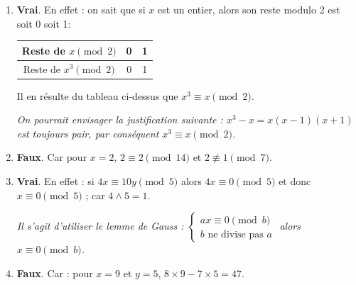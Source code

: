 \documentclass[11pt]{article}
\newcommand{\checkmarkline}[1]{\par\hspace{1.5em}\checkmark\quad \textit{#1}}
\begin{document}
\begin{enumerate}
    \item \textbf{Vrai}. En effet : on sait que si $x$ est un entier, alors son reste modulo 2 est soit 0 soit 1:
    \begin{center}
    \begin{tabular}{|c|c|c|}
        \hline
        Reste de $x \pmod 2$ & 0 & 1 \\
        \hline
        Reste de $x^3 \pmod 2$ & 0 & 1 \\
        \hline
    \end{tabular}
    \end{center}
    Il en résulte du tableau ci-dessus que $x^3 \equiv x \pmod 2$.
    \checkmarkline{On pourrait envisager la justification suivante : $x^3 - x = x(x-1)(x+1)$ est toujours pair, par conséquent $x^3 \equiv x \pmod 2$.}

    \item \textbf{Faux}. Car pour $x=2$, $2 \equiv 2 \pmod{14}$ et $2 \not\equiv 1 \pmod 7$.

    \item \textbf{Vrai}. En effet : si $4x \equiv 10y \pmod 5$ alors $4x \equiv 0 \pmod 5$ et donc $x \equiv 0 \pmod 5$ ; car $4 \wedge 5 = 1$.
    \checkmarkline{Il s'agit d'utiliser le lemme de Gauss : $\begin{cases} ax \equiv 0 \pmod b \\ b \text{ ne divise pas } a \end{cases}$ alors $x \equiv 0 \pmod b$.}

    \item \textbf{Faux}. Car : pour $x=9$ et $y=5$, $8 \times 9 - 7 \times 5 = 47$.
\end{enumerate}
\end{document}
